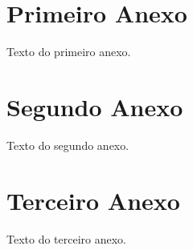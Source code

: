 \begin{anexosenv}

\partanexos

\chapter{Primeiro Anexo}

Texto do primeiro anexo.

\chapter{Segundo Anexo}

Texto do segundo anexo.

\chapter{Terceiro Anexo}

Texto do terceiro anexo.

\end{anexosenv}

